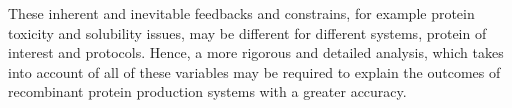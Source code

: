  These inherent and inevitable feedbacks and constrains, for example protein toxicity and solubility issues, may be different for different systems, protein of interest and protocols. Hence, a more rigorous and detailed analysis, which takes into account of all of these variables may be required to explain the outcomes of recombinant protein production systems with a greater accuracy.


